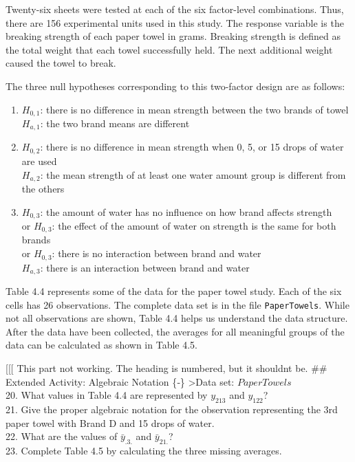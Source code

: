 \documentclass[
]{report}
\begin{document}
Twenty-six sheets were tested at each of the six factor-level combinations. Thus, there are 156 experimental units used in this study. The response variable is the breaking strength of each paper towel in grams. Breaking strength is defined as the total weight that each towel successfully held. The next additional weight caused the towel to break.

The three null hypotheses corresponding to this two-factor design are as follows:

\begin{enumerate}
\def\labelenumi{\arabic{enumi}.}
\item
  \(H_{0,1}\): there is no difference in mean strength between the two brands of towel\\
  \(H_{a,1}\): the two brand means are different
\item
  \(H_{0,2}\): there is no difference in mean strength when 0, 5, or 15 drops of water are used\\
  \(H_{a,2}\): the mean strength of at least one water amount group is different from the others
\item
  \(H_{0,3}\): the amount of water has no influence on how brand affects strength\\
  or \(H_{0,3}\): the effect of the amount of water on strength is the same for both brands\\
  or \(H_{0,3}\): there is no interaction between brand and water\\
  \(H_{a,3}\): there is an interaction between brand and water
\end{enumerate}

Table 4.4 represents some of the data for the paper towel study. Each of the six cells has 26 observations. The complete data set is in the file \texttt{PaperTowels}. While not all observations are shown, Table 4.4 helps us understand the data structure. After the data have been collected, the averages for all meaningful groups of the data can be calculated as shown in Table 4.5.

{[}{[}{[} This part not working. The heading is numbered, but it shouldnt be.
\#\# Extended Activity: Algebraic Notation \{‑\}
\textgreater Data set: \(PaperTowels\)\\
20. What values in Table 4.4 are represented by \(y_{213}\) and \(y_{122}\)?\\
21. Give the proper algebraic notation for the observation representing the 3rd paper towel with Brand D
and 15 drops of water.\\
22. What are the values of \(\bar{y}_{.3.}\) and \(\bar{y}_{21.}\)?\\
23. Complete Table 4.5 by calculating the three missing averages.
\end{document}
